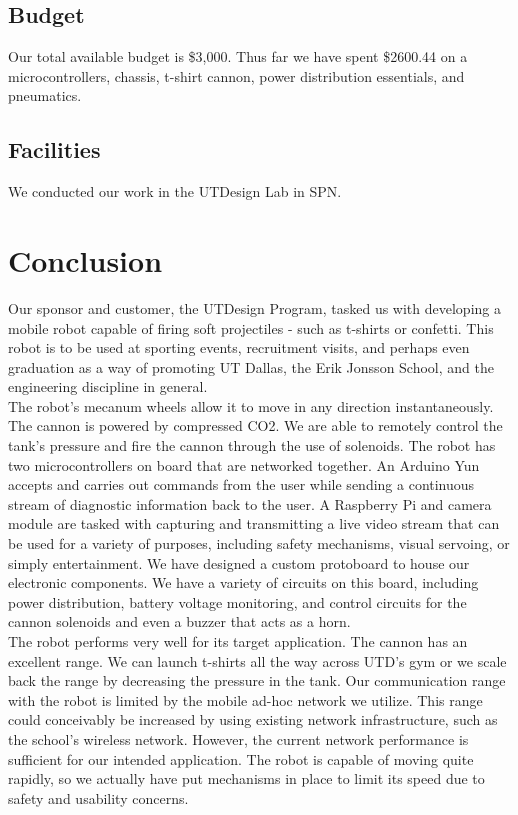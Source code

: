 \documentclass[letterpaper,12pt]{article}
\begin{document}
\subsection{Budget}

Our total available budget is \$3,000. Thus far we have spent \$2600.44 on
a microcontrollers, chassis, t-shirt cannon, power distribution essentials, and
pneumatics.

\subsection{Facilities}
We conducted our work in the UTDesign Lab in SPN.

\section{Conclusion}
\label{sec:conclusion}

Our sponsor and customer, the UTDesign Program, tasked us with developing
a mobile robot capable of firing soft projectiles - such as t-shirts or
confetti. This robot is to be used at sporting events, recruitment visits, and
perhaps even graduation as a way of promoting UT Dallas, the Erik Jonsson
School, and the engineering discipline in general.\\

The robot's mecanum wheels allow it to move in any direction instantaneously.
The cannon is powered by compressed CO2. We are able to remotely control the
tank's pressure and fire the cannon through the use of solenoids. The robot has
two microcontrollers on board that are networked together. An Arduino Yun
accepts and carries out commands from the user while sending a continuous
stream of diagnostic information back to the user. A Raspberry Pi and camera
module are tasked with capturing and transmitting a live video stream that can
be used for a variety of purposes, including safety mechanisms, visual
servoing, or simply entertainment. We have designed a custom protoboard to
house our electronic components. We have a variety of circuits on this board,
including power distribution, battery voltage monitoring, and control circuits
for the cannon solenoids and even a buzzer that acts as a horn.\\

The robot performs very well for its target application. The cannon has an
excellent range. We can launch t-shirts all the way across UTD's gym or we
scale back the range by decreasing the pressure in the tank. Our communication
range with the robot is limited by the mobile ad-hoc network we utilize. This
range could conceivably be increased by using existing network infrastructure,
such as the school's wireless network. However, the current network performance
is sufficient for our intended application. The robot is capable of moving
quite rapidly, so we actually have put mechanisms in place to limit its speed
due to safety and usability concerns.
\end{document}
